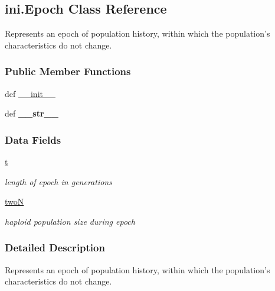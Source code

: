 \hypertarget{classini_1_1_epoch}{\subsection{ini.\-Epoch Class Reference}
\label{classini_1_1_epoch}
}


Represents an epoch of population history, within which the population's characteristics do not change.  


\subsubsection*{Public Member Functions}
\begin{DoxyCompactItemize}
\item 
def \hyperlink{classini_1_1_epoch_aab954d54f8c04e76dd169b4dcb27fefd}{\-\_\-\-\_\-init\-\_\-\-\_\-}
\item 
\hypertarget{classini_1_1_epoch_a18068a5b112c76122d491002f0b44964}{def {\bfseries \-\_\-\-\_\-str\-\_\-\-\_\-}}\label{classini_1_1_epoch_a18068a5b112c76122d491002f0b44964}

\end{DoxyCompactItemize}
\subsubsection*{Data Fields}
\begin{DoxyCompactItemize}
\item 
\hypertarget{classini_1_1_epoch_a603d7e2b4339acbea9d033d7ee52d0a6}{\hyperlink{classini_1_1_epoch_a603d7e2b4339acbea9d033d7ee52d0a6}{t}}\label{classini_1_1_epoch_a603d7e2b4339acbea9d033d7ee52d0a6}

\begin{DoxyCompactList}\small\item\em length of epoch in generations \end{DoxyCompactList}\item 
\hypertarget{classini_1_1_epoch_ada6346e6a8ebbd2277f593dfc9a3e20d}{\hyperlink{classini_1_1_epoch_ada6346e6a8ebbd2277f593dfc9a3e20d}{two\-N}}\label{classini_1_1_epoch_ada6346e6a8ebbd2277f593dfc9a3e20d}

\begin{DoxyCompactList}\small\item\em haploid population size during epoch \end{DoxyCompactList}\end{DoxyCompactItemize}


\subsubsection{Detailed Description}
Represents an epoch of population history, within which the population's characteristics do not change. 



